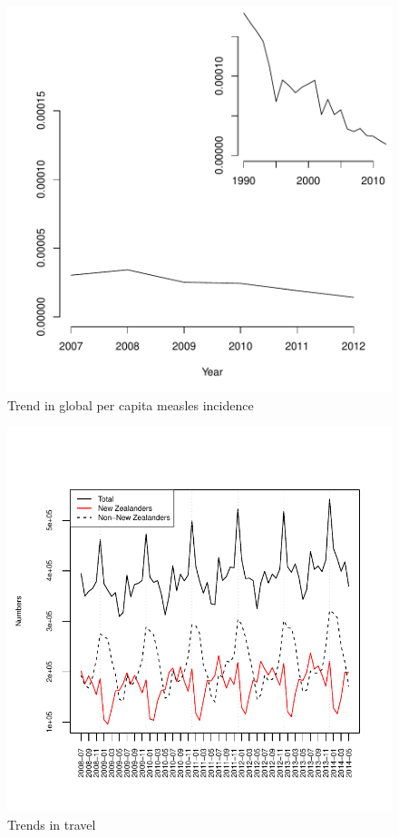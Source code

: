\documentclass{article}
\begin{document}
\begin{figure}[h!]
\begin{center}
\includegraphics{draftfinalreport-030}
\end{center}
\caption{Trend in global per capita measles incidence}
\label{fig:trendincidence}
\end{figure}

\begin{figure}
     \begin{center}
     \includegraphics[width=1\textwidth]{nzers.pdf}
     \end{center}
     \caption{Trends in travel}
     \label{fig:travel}
\end{figure}
\end{document}
